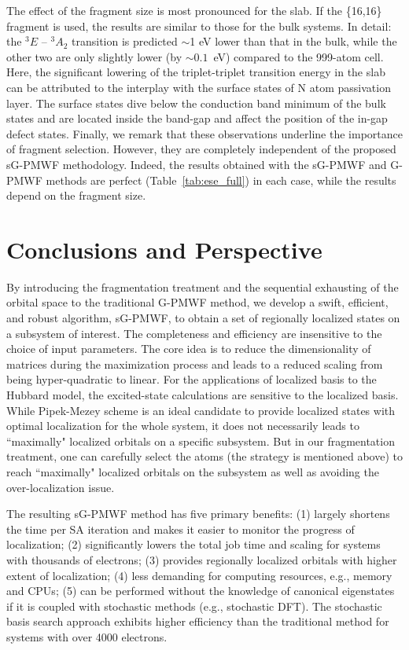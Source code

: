 \documentclass[journal=jacsat,manuscript=article]{achemso}
\begin{document}
The effect of the fragment size is most pronounced for the slab. If the \{16,16\} fragment is used, the results are similar to those for the bulk systems. In detail: the $^3E$ -- $^3A_2$ transition is predicted $\sim$1 eV lower than that in the bulk, while the other two are only slightly lower (by $\sim 0.1$~eV) compared to the 999-atom cell. Here, the significant lowering of the triplet-triplet transition energy in the slab can be attributed to the interplay with the surface states of N atom passivation layer. The surface states dive below the conduction band minimum of the bulk states and are located inside the band-gap and affect the position of the in-gap defect states. Finally, we remark that these observations underline the importance of fragment selection. However, they are completely independent of the proposed sG-PMWF methodology. Indeed, the results obtained with the sG-PMWF and G-PMWF methods are perfect (Table~\ref{tab:ese_full}) in each case, while the results depend on the fragment size.


\section{Conclusions and Perspective}
By introducing the fragmentation treatment and the sequential exhausting of the orbital space to the traditional G-PMWF method, we develop a swift, efficient, and robust algorithm, sG-PMWF, to obtain a set of regionally localized states on a subsystem of interest. The completeness and efficiency are insensitive to the choice of input parameters. The core idea is to reduce the dimensionality of matrices during the maximization process and leads to a reduced scaling from being hyper-quadratic to linear. For the applications of localized basis to the Hubbard model, the excited-state calculations are sensitive to the localized basis. While Pipek-Mezey scheme is an ideal candidate to provide localized states with optimal localization for the whole system, it does not necessarily leads to ``maximally" localized orbitals on a specific subsystem. But in our fragmentation treatment, one can carefully select the atoms (the strategy is mentioned above) to reach ``maximally" localized orbitals on the subsystem as well as avoiding the over-localization issue. 

The resulting sG-PMWF method has five primary benefits: (1) largely shortens the time per SA iteration and makes it easier to monitor the progress of localization; (2) significantly lowers the total job time and scaling for systems with thousands of electrons;  (3) provides regionally localized orbitals with higher extent of localization; (4) less demanding for computing resources, e.g., memory and CPUs; (5) can be performed without the knowledge of canonical eigenstates if it is coupled with stochastic methods (e.g., stochastic DFT). The stochastic basis search approach exhibits higher efficiency than the traditional method for systems with over 4000 electrons.
\end{document}
